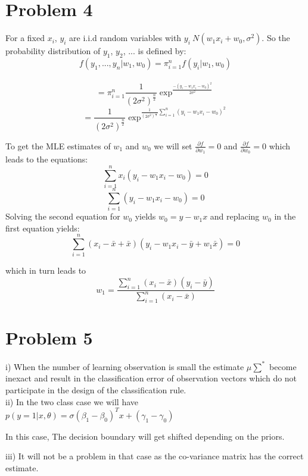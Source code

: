 \documentclass[10pt,onecolumn,letterpaper]{article}
\begin{document}
\section{Problem 4}
For a fixed $x_i$, $y_i$ are i.i.d random variables with $y_i ~ N(w_1x_i +w_0, \sigma^2)$. So the
probability distribution of $y_1$, $y_2$, ... is defined by:\\
$$f(y_1, ..., y_n|w_1,w_0) = \pi_{i=1}^nf(y_i|w_1,w_0)$$\\
$$= \pi_{i=1}^n\frac{1}{(2\sigma^2)^{\frac{n}{2}}} \exp^\frac{-(y_i-w_1x_i-w_0)^2}{2\sigma^2}$$
$$= \frac{1}{(2\sigma^2)^{\frac{n}{2}}} \exp^{\frac{1}{(2\sigma^2)^{\frac{n}{2}}}\sum_{i=1}^n{(y_i-w_1x_i-w_0)^2}}$$

To get the MLE estimates of $w_1$ and $w_0$ we will set $\frac{\partial f}{\partial w_1} = 0$ and $\frac{\partial f}{\partial w_0} = 0$
which leads to the equations:\\
$$
\sum_{i=1}^nx_i(y_i-w_1x_i-w_0)=0
$$
$$
\sum_{i=1}^n(y_i-w_1x_i-w_0)=0
$$
Solving the second equation for $w_0$ yields $w_0 = y - w_1x$ and replacing $w_0$ in the first equation yields:\\
$$
\sum_{i=1}^n(x_i-\bar{x}+\bar{x})(y_i-w_1x_i-\bar{y}+w_1\bar{x})=0
$$

which in turn leads to \\
$$
w_1 = \frac{ \sum_{i=1}^n(x_i-\bar{x})(y_i-\bar{y})}{\sum_{i=1}^n(x_i-\bar{x})}
$$

\section{Problem 5}
i) When  the number of learning observation is small the estimate $\mu\sum^*$ become inexact and result in the classification error of observation vectors which do not participate in the design of the classification rule.\\

ii) In the two class case we will have $p(y=1|x,\theta)= \sigma(\beta_1-\beta_0)^Tx+(\gamma_1-\gamma_0)$

In this case, The decision boundary will get shifted depending on the priors. 

iii) It will not be a problem in that case as the co-variance matrix has the correct estimate.
\end{document}
